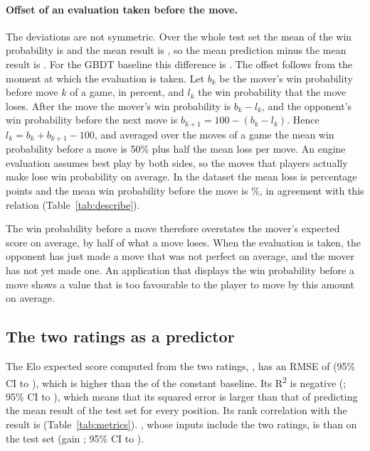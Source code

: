 \documentclass[11pt]{article}
\begin{document}
\paragraph{Offset of an evaluation taken before the move.}
The deviations are not symmetric. Over the whole test set the mean of the win
probability is  and the mean result is
, so the mean prediction minus the mean result is
. For the GBDT baseline this difference is
. The offset follows from the moment at which the
evaluation is taken. Let $b_k$ be the mover's win probability before move $k$
of a game, in percent, and $l_k$ the win probability that the move loses.
After the move the mover's win probability is $b_k - l_k$, and the opponent's
win probability before the next move is $b_{k+1} = 100 - (b_k - l_k)$. Hence
$l_k = b_k + b_{k+1} - 100$, and averaged over the moves of a game the mean
win probability before a move is 50\% plus half the mean loss per move. An
engine evaluation assumes best play by both sides, so the moves that players
actually make lose win probability on average. In the dataset the mean loss
is  percentage points and the mean win probability
before the move is \%, in agreement with this
relation (Table~\ref{tab:describe}).

The win probability before a move therefore overstates the mover's expected
score on average, by half of what a move loses. When the evaluation is taken,
the opponent has just made a move that was not perfect on average, and the
mover has not yet made one. An application that displays the win probability
before a move shows a value that is too favourable to the player to move by
this amount on average.
\fi

\subsection{The two ratings as a predictor}
\label{sec:rating-baseline}

The Elo expected score computed from the two ratings, , has an
RMSE of  (95\% CI  to
), which is higher than the  of the
constant baseline. Its R\textsuperscript{2} is negative (;
95\% CI  to ), which means that
its squared error is larger than that of predicting the mean result of the
test set for every position. Its rank correlation with the result is
 (Table~\ref{tab:metrics}).
\ifpairs
{}, whose inputs include the two ratings, is
 than  on the test set (gain
; 95\% CI
 to
).
\fi
\end{document}
